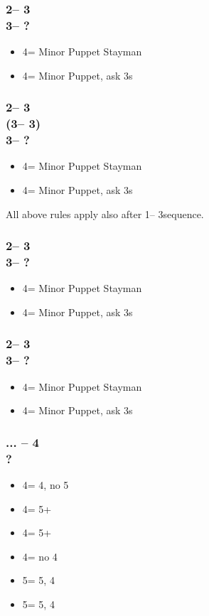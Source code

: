 \subsubsection*{2\nt -- 3\clubs\\
                3\major -- ?}
\begin{itemize}
    \item 4\clubs = Minor Puppet Stayman
    \item 4\diams = Minor Puppet, ask 3s
\end{itemize}

\subsubsection*{2\nt -- 3\clubs\\
                (3\diams -- 3\major)\\
                3\nt -- ?}
\begin{itemize}
    \item 4\clubs = Minor Puppet Stayman
    \item 4\diams = Minor Puppet, ask 3s
\end{itemize}

All above rules apply also after 1\nt -- 3\clubs sequence.

\subsubsection*{2\nt -- 3\diams\\
                3\hearts -- ?}
\begin{itemize}
    \item 4\clubs = Minor Puppet Stayman
    \item 4\diams = Minor Puppet, ask 3s
\end{itemize}

\subsubsection*{2\nt -- 3\hearts\\
                3\spades -- ?}
\begin{itemize}
    \item 4\clubs = Minor Puppet Stayman
    \item 4\diams = Minor Puppet, ask 3s
\end{itemize}

\subsubsection*{... -- 4\clubs\\
                ?}
\begin{itemize}
    \item 4\diams = 4\minor, no 5\minor
    \item 4\hearts = 5+\clubs
    \item 4\spades = 5+\diams
    \item 4\nt = no 4\minor
    \item 5\clubs = 5\clubs, 4\diams
    \item 5\diams = 5\diams, 4\clubs
\end{itemize}

